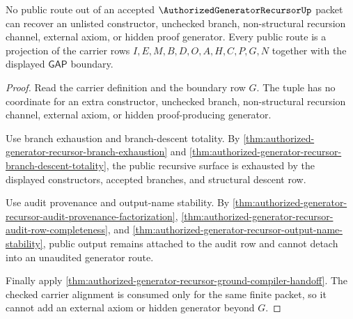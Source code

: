 \begin{theorem}
\label{thm:authorized-generator-recursor-hidden-generator-exclusion}
No public route out of an accepted $\AuthorizedGeneratorRecursorUp$ packet can recover an unlisted constructor, unchecked branch, non-structural recursion channel, external axiom, or hidden proof generator. Every public route is a projection of the carrier rows $I,E,M,B,D,O,A,H,C,P,G,N$ together with the displayed $\mathsf{GAP}$ boundary.
\end{theorem}
\begin{proof}
Read the carrier definition and the boundary row $G$. The tuple has no coordinate for an extra constructor, unchecked branch, non-structural recursion channel, external axiom, or hidden proof-producing generator.

Use branch exhaustion and branch-descent totality. By \autoref{thm:authorized-generator-recursor-branch-exhaustion} and \autoref{thm:authorized-generator-recursor-branch-descent-totality}, the public recursive surface is exhausted by the displayed constructors, accepted branches, and structural descent row.

Use audit provenance and output-name stability. By \autoref{thm:authorized-generator-recursor-audit-provenance-factorization}, \autoref{thm:authorized-generator-recursor-audit-row-completeness}, and \autoref{thm:authorized-generator-recursor-output-name-stability}, public output remains attached to the audit row and cannot detach into an unaudited generator route.

Finally apply \autoref{thm:authorized-generator-recursor-ground-compiler-handoff}. The checked carrier alignment is consumed only for the same finite packet, so it cannot add an external axiom or hidden generator beyond $G$.
\end{proof}

